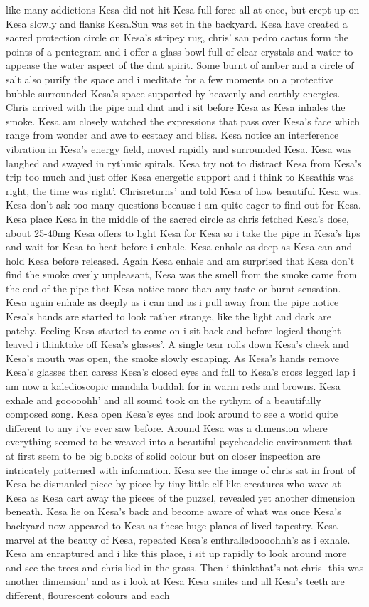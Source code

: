 \documentclass[12pt]{book}
\begin{document}
like many addictions Kesa did not hit Kesa full force all at once, but crept up on Kesa slowly and flanks Kesa.Sun was set in the backyard. Kesa have created a sacred protection circle on Kesa's stripey rug, chris' san pedro cactus form the points of a pentegram and i offer a glass bowl full of clear crystals and water to appease the water aspect of the dmt spirit. Some burnt of amber and a circle of salt also purify the space and i meditate for a few moments on a protective bubble surrounded Kesa's space supported by heavenly and earthly energies. Chris arrived with the pipe and dmt and i sit before Kesa as Kesa inhales the smoke. Kesa am closely watched the expressions that pass over Kesa's face which range from wonder and awe to ecstacy and bliss. Kesa notice an interference vibration in Kesa's energy field, moved rapidly and surrounded Kesa. Kesa was laughed and swayed in rythmic spirals. Kesa try not to distract Kesa from Kesa's trip too much and just offer Kesa energetic support and i think to Kesathis was right, the time was right'. Chrisreturns' and told Kesa of how beautiful Kesa was. Kesa don't ask too many questions because i am quite eager to find out for Kesa. Kesa place Kesa in the middle of the sacred circle as chris fetched Kesa's dose, about 25-40mg Kesa offers to light Kesa for Kesa so i take the pipe in Kesa's lips and wait for Kesa to heat before i enhale. Kesa enhale as deep as Kesa can and hold Kesa before released. Again Kesa enhale and am surprised that Kesa don't find the smoke overly unpleasant, Kesa was the smell from the smoke came from the end of the pipe that Kesa notice more than any taste or burnt sensation. Kesa again enhale as deeply as i can and as i pull away from the pipe notice Kesa's hands are started to look rather strange, like the light and dark are patchy. Feeling Kesa started to come on i sit back and before logical thought leaved i thinktake off Kesa's glasses'. A single tear rolls down Kesa's cheek and Kesa's mouth was open, the smoke slowly escaping. As Kesa's hands remove Kesa's glasses then caress Kesa's closed eyes and fall to Kesa's cross legged lap i am now a kaledioscopic mandala buddah for in warm reds and browns. Kesa exhale and gooooohh' and all sound took on the rythym of a beautifully composed song. Kesa open Kesa's eyes and look around to see a world quite different to any i've ever saw before. Around Kesa was a dimension where everything seemed to be weaved into a beautiful psycheadelic environment that at first seem to be big blocks of solid colour but on closer inspection are intricately patterned with infomation. Kesa see the image of chris sat in front of Kesa be dismanled piece by piece by tiny little elf like creatures who wave at Kesa as Kesa cart away the pieces of the puzzel, revealed yet another dimension beneath. Kesa lie on Kesa's back and become aware of what was once Kesa's backyard now appeared to Kesa as these huge planes of lived tapestry. Kesa marvel at the beauty of Kesa, repeated Kesa's enthralledoooohhh's as i exhale. Kesa am enraptured and i like this place, i sit up rapidly to look around more and see the trees and chris lied in the grass. Then i thinkthat's not chris- this was another dimension' and as i look at Kesa Kesa smiles and all Kesa's teeth are different, flourescent colours and each 
\end{document}
